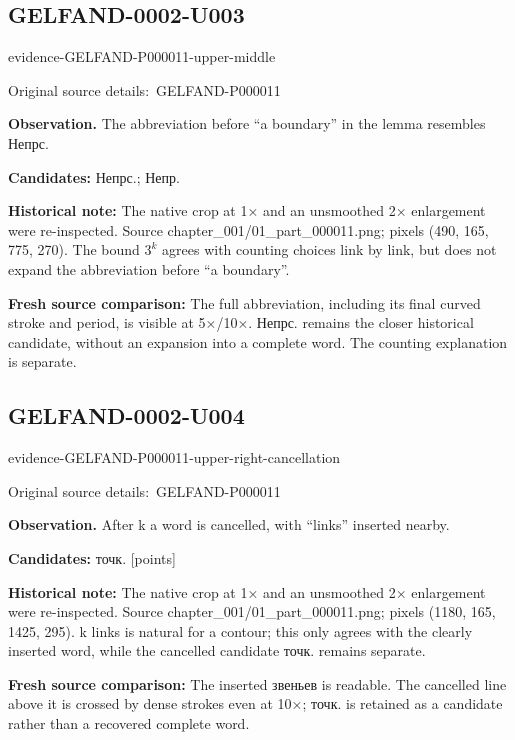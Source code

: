 \documentclass[11pt]{article}
\newcommand{\EvidenceBlock}[4]{%
 \par\smallskip\noindent\begin{minipage}{\linewidth}
 \begin{minipage}[t]{.47\linewidth}\vspace{0pt}\centering
 \csname evidence-#1-#2\endcsname\par
 {\scriptsize\SourceCropCaption\ #1}\par
 \end{minipage}\hfill
 \begin{minipage}[t]{.49\linewidth}\vspace{0pt}\raggedright
 {\small\color{orange!65!black}\textbf{#4} #3}\par
 \end{minipage}
 \end{minipage}\par\smallskip}
\newcommand{\SourceCropCaption}{Original source details:}\newcommand{\ReadingCaption}{Uncertain reading.}\newcommand{\IncompleteCaption}{Undeciphered passage.}\newcommand{\DiagramCaption}{Diagram and typed description.}
\begin{document}
\subsection*{GELFAND-0002-U003}
\EvidenceBlock{GELFAND-P000011}{upper-middle}{The abbreviation before “a boundary” in the lemma resembles Непрс.}{Observation.}
\par\smallskip\noindent\textbf{Candidates: } Непрс.; Непр.\par
\par\smallskip\noindent\textbf{Historical note: } The native crop at 1× and an unsmoothed 2× enlargement were re-inspected. Source chapter\_001/01\_part\_000011.png; pixels (490, 165, 775, 270). The bound \(3^k\) agrees with counting choices link by link, but does not expand the abbreviation before “a boundary”.\par
\par\smallskip\noindent\textbf{Fresh source comparison: } The full abbreviation, including its final curved stroke and period, is visible at 5×/10×. Непрс. remains the closer historical candidate, without an expansion into a complete word. The counting explanation is separate.\par

\subsection*{GELFAND-0002-U004}
\EvidenceBlock{GELFAND-P000011}{upper-right-cancellation}{After k a word is cancelled, with “links” inserted nearby.}{Observation.}
\par\smallskip\noindent\textbf{Candidates: } точк. [points]\par
\par\smallskip\noindent\textbf{Historical note: } The native crop at 1× and an unsmoothed 2× enlargement were re-inspected. Source chapter\_001/01\_part\_000011.png; pixels (1180, 165, 1425, 295). k links is natural for a contour; this only agrees with the clearly inserted word, while the cancelled candidate точк. remains separate.\par
\par\smallskip\noindent\textbf{Fresh source comparison: } The inserted звеньев is readable. The cancelled line above it is crossed by dense strokes even at 10×; точк. is retained as a candidate rather than a recovered complete word.\par
\end{document}
